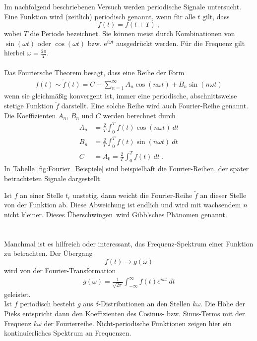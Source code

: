 Im nachfolgend beschriebenen Versuch werden periodische Signale untersucht. \\
Eine Funktion wird (zeitlich) periodisch genannt, wenn für alle $t$ gilt, dass
\[ f(t) = f(t+T) \ , \]
wobei $T$ die Periode bezeichnet. Sie können meist durch Kombinationen von $\sin(\omega t)$ oder $\cos(\omega t)$ bzw. $\mathrm{e}^{i\omega t}$ ausgedrückt werden. Für die Frequenz gilt hierbei $\omega = \frac{2\pi}{T} $. \\
\ \\
Das Fouriersche Theorem besagt, dass eine Reihe der Form
\begin{align}
	f(t) \sim \tilde{f}(t) =  C + \sum_{n = 1}^{\infty} A_n\cos(n\omega t)+B_n\sin(n\omega t)
\end{align}
wenn sie gleichmäßig konvergent ist, immer eine periodische, abschnittsweise stetige Funktion $\tilde{f}$ darstellt. Eine solche Reihe wird auch Fourier-Reihe genannt. Die Koeffizienten $A_n$, $B_n$ und $C$ werden berechnet durch
\begin{align}
	A_n &= \frac{2}{T}\int_0^T f(t)\cos(n\omega t)\ dt \\
	B_n &= \frac{2}{T}\int_0^T f(t)\sin(n\omega t)\ dt \\
	C &= A_0 = \frac{2}{T}\int_0^Tf(t)\ dt \ .
\end{align}
In Tabelle \ref{fig:Fourier_Beispiele} sind beispielhaft die Fourier-Reihen, der später betrachteten Signale dargestellt.

Ist $f$ an einer Stelle $t_i$ unstetig, dann weicht die Fourier-Reihe $\tilde{f}$ an dieser Stelle von der Funktion ab. Diese Abweichung ist endlich und wird mit wachsendem $n$ nicht kleiner. Dieses \glqq Überschwingen\grqq\ wird Gibb'sches Phänomen genannt. \\
\ \\
\ \\
Manchmal ist es hilfreich oder interessant, das Frequenz-Spektrum einer Funktion zu betrachten. Der Übergang
\[ f(t)\rightarrow g(\omega) \]
wird von der Fourier-Transformation
\begin{align}\label{Transformation}
	g(\omega) = \frac{1}{\sqrt{2\pi}}\int_{-\infty}^{\infty}f(t)e^{i\omega t}\ dt
\end{align}
geleistet. \\
Ist $f$ periodisch besteht $g$ aus $\delta$-Distributionen an den Stellen $k\omega$. Die Höhe der Pieks entspricht dann den Koeffizienten des Cosinus- bzw. Sinus-Terms mit der Frequenz $k\omega$ der Fourierreihe. Nicht-periodische Funktionen zeigen hier ein kontinuierliches Spektrum an Frequenzen.